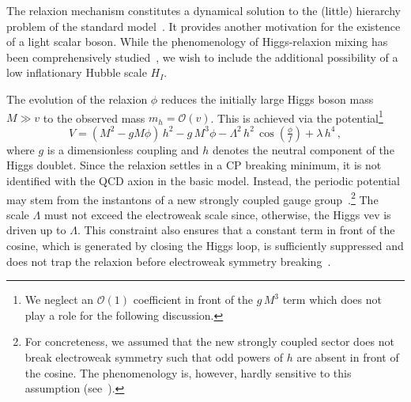 \documentclass[preprintnumbers,twocolumn,aps,floats,nofootinbib]{revtex4-1}
\begin{document}
The relaxion mechanism constitutes a dynamical solution to the (little) hierarchy problem of the standard model~\cite{Graham:2015cka}. It  provides another motivation for the existence of a light scalar boson. While the phenomenology of Higgs-relaxion mixing has been comprehensively studied~\cite{Choi:2016luu,Flacke:2016szy}, we wish to include the additional possibility of a low inflationary Hubble scale $H_I$. 

The evolution of the relaxion $\phi$ reduces the initially large Higgs boson mass $M\gg v$ to the observed mass $m_h=\mathcal{O}(v)$. This is achieved via the potential\footnote{We neglect an $\mathcal{O}(1)$ coefficient in front of the $g\,M^3$ term which does not play a role for the following discussion.}
\begin{equation}\label{eq:relaxionpotential}
V = (M^2 - gM \phi) \,h^2 - g\,M^3 \phi - \Lambda^2 \,h^2\, \cos\left(\tfrac{\phi}{f}\right)+\lambda\,h^4\,,
\end{equation}
where $g$ is a dimensionless coupling and $h$ denotes the neutral component of the Higgs doublet. Since the relaxion settles in a CP breaking minimum, it is not identified with the QCD axion in the basic model. Instead, the periodic potential may stem from the instantons of a new strongly coupled gauge group~\cite{Graham:2015cka}.\footnote{For concreteness, we assumed that the new strongly coupled sector does not break electroweak symmetry such that odd powers of $h$ are absent in front of the cosine. The phenomenology is, however, hardly sensitive to this assumption (see~\cite{Flacke:2016szy}).} The scale $\Lambda$ must not exceed the electroweak scale since, otherwise, the Higgs vev is driven up to $\Lambda$. This constraint also ensures that a constant term in front of the cosine, which is generated by closing the Higgs loop, is sufficiently suppressed and does not trap the relaxion before electroweak symmetry breaking~\cite{Choi:2016luu,Flacke:2016szy}.
\end{document}
